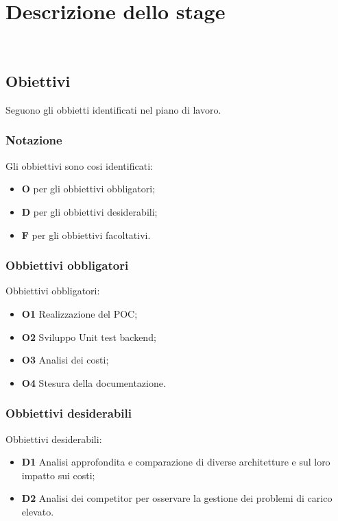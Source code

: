 \chapter{Descrizione dello stage}
\\
\label{cap:descrizione-stage}
\section{Obiettivi}
\label{sec:obiettivi}
Seguono gli obbietti identificati nel piano di lavoro.
\subsection{Notazione}
\label{subsec:notazione}
Gli obbiettivi sono cosi identificati:
\begin{itemize}
    \item \textbf{O} per gli obbiettivi obbligatori;
    \item \textbf{D} per gli obbiettivi desiderabili;
    \item \textbf{F} per gli obbiettivi facoltativi.
\end{itemize}
\subsection{Obbiettivi obbligatori}
Obbiettivi obbligatori:
\begin{itemize}
    \item \textbf{O1} Realizzazione del POC;
    \item \textbf{O2} Sviluppo Unit test backend;
    \item \textbf{O3} Analisi dei costi;
    \item \textbf{O4} Stesura della documentazione.
\end{itemize}
\subsection{Obbiettivi desiderabili}
Obbiettivi desiderabili:
\begin{itemize}
    \item \textbf{D1} Analisi approfondita e comparazione di diverse architetture e sul loro impatto sui costi;
    \item \textbf{D2} Analisi dei competitor per osservare la gestione dei problemi di carico elevato.
\end{itemize}
